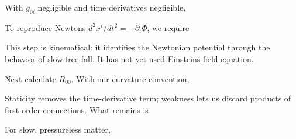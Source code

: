 \documentclass[
  11pt,
  letterpaper,
  oneside,
  openany]{scrbook}
\begin{document}
With \(g_{0i}\) negligible and time derivatives negligible,

\begin{center}
\begingroup
{}
\ifdim\wd\grmathbox>\linewidth
\resizebox{\linewidth}{!}{\usebox{\grmathbox}}
\else\usebox{\grmathbox}\fi
\endgroup
\end{center}

To reproduce Newton\textquotesingle s \(d^2x^i/dt^2=-\partial_i\Phi\),
we require

\begin{center}
\begingroup
{}
\ifdim\wd\grmathbox>\linewidth
\resizebox{\linewidth}{!}{\usebox{\grmathbox}}
\else\usebox{\grmathbox}\fi
\endgroup
\end{center}

This step is kinematical: it identifies the Newtonian potential through
the behavior of slow free fall. It has not yet used
Einstein\textquotesingle s field equation.

Next calculate \(R_{00}\). With our curvature convention,

\begin{center}
\begingroup
{}
\ifdim\wd\grmathbox>\linewidth
\resizebox{\linewidth}{!}{\usebox{\grmathbox}}
\else\usebox{\grmathbox}\fi
\endgroup
\end{center}

Staticity removes the time-derivative term; weakness lets us discard
products of first-order connections. What remains is

\begin{center}
\begingroup
{}
\ifdim\wd\grmathbox>\linewidth
\resizebox{\linewidth}{!}{\usebox{\grmathbox}}
\else\usebox{\grmathbox}\fi
\endgroup
\end{center}

For slow, pressureless matter,
\end{document}
